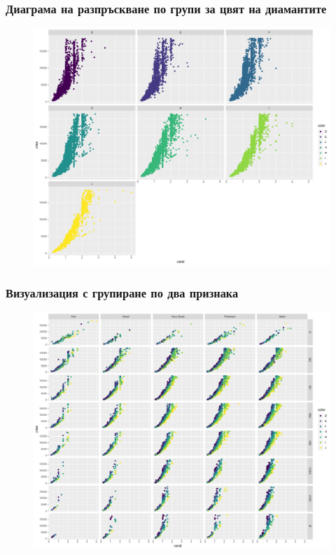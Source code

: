 \documentclass{beamer}
\begin{document}
\begin{frame}
\frametitle{Диаграма на разпръскване по групи за цвят на диамантите}
\begin{figure}[]\includegraphics[width=\textwidth,height=0.75\textheight]{pic0034}\end{figure}
\end{frame}

\begin{frame}
\frametitle{Визуализация с групиране по два признака}
\begin{figure}[]\includegraphics[width=\textwidth,height=0.75\textheight]{pic0035}\end{figure}
\end{frame}
\end{document}
